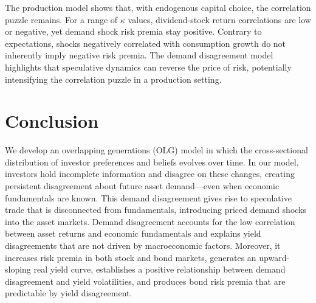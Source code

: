 \documentclass[preprint,11pt,authoryear]{elsarticle}
\renewcommand{\baselinestretch}{2}
\theoremstyle{plain}
\begin{document}
The production model shows that, with endogenous capital choice, the correlation puzzle remains. For a range of \( \kappa \) values, dividend-stock return correlations are low or negative, yet demand shock risk premia stay positive. Contrary to expectations, shocks negatively correlated with consumption growth do not inherently imply negative risk premia. The demand disagreement model highlights that speculative dynamics can reverse the price of risk, potentially intensifying the correlation puzzle in a production setting.





\section{Conclusion}\label{sec:conclusion}

We develop an overlapping generations (OLG) model in which the cross-sectional distribution of investor preferences and beliefs evolves over time. In our model, investors hold incomplete information and disagree on these changes, creating persistent disagreement about future asset demand—even when economic fundamentals are known. This demand disagreement gives rise to speculative trade that is disconnected from fundamentals, introducing priced demand shocks into the asset markets.  Demand disagreement accounts for the low correlation between asset returns and economic fundamentals and explains yield disagreements that are not driven by macroeconomic factors. Moreover, it increases risk premia in both stock and bond markets, generates an upward-sloping real yield curve, establishes a positive relationship between demand disagreement and yield volatilities, and produces bond risk premia that are predictable by yield disagreement. 


 \begingroup
	
	\label{references}
\endgroup   

\renewcommand{\baselinestretch}{1}  %
    

\appendix

 
\end{document}
